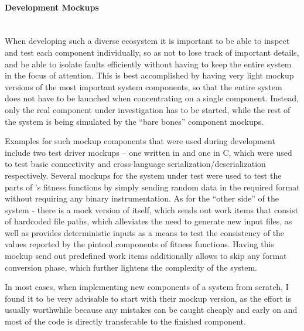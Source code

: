 \paragraph{Development Mockups} ~\\
When developing such a diverse ecosystem it is important to be able to inspect and test each component
individually, so as not to lose track of important details, and be able to isolate faults efficiently without
having to keep the entire system in the focus of attention. This is best accomplished by having very light
mockup versions of the most important system components, so that the entire system does not have to be launched
when concentrating on a single component. Instead, only the real component under investigation has to be
started, while the rest of the system is being simulated by the ``bare bones'' component  mockups. 

Examples for such mockup components that were used during development include two test driver mockups -- one
written in \java and one in {\small C}, which were used to test basic \zmq connectivity and
cross-language \msgpack serialization/deserialization respectively. Several mockups for the system under test
were used to test the \java parts of \xmlmate's fitness functions by simply sending random data in the
required \msgpack format without requiring any binary instrumentation. As for the ``other side'' of the system
- there is a mock version of \xmlmate itself, which sends out work items that consist of hardcoded file paths,
which alleviates the need to generate new input files, as well as provides deterministic inputs as a means to
test the consistency of the values reported by the pintool components of fitness functions. Having this mockup
send out predefined work items additionally allows to skip any format conversion phase, which further lightens
the complexity of the system. 

In most cases, when implementing new components of a system from scratch, I found it to be very advisable to
start with their mockup version, as the effort is usually worthwhile because any mistakes can be caught
cheaply and early on and most of the code is directly transferable to the finished component.
\FloatBarrier